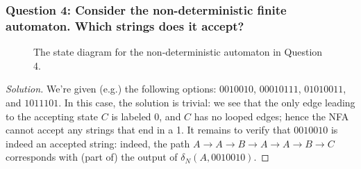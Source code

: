 \subsubsection*{Question 4: Consider the non-deterministic finite automaton. Which strings does it accept?}
\begin{figure}[ht]
\caption{The state diagram for the non-deterministic automaton in Question 4.}
\end{figure}
\begin{proof}[Solution]
We're given (e.g.) the following options: $0010010$, $00010111$, $01010011$, and $1011101$. In this case, the solution is trivial: we see that the only edge leading to the accepting state $C$ is labeled 0, and $C$ has no looped edges; hence the NFA cannot accept any strings that end in a 1. It remains to verify that $0010010$ is indeed an accepted string: indeed, the path $A \to A \to B \to A \to A \to B \to C$ corresponds with (part of) the output of $\delta_N(A, 0010010)$.
\end{proof}

